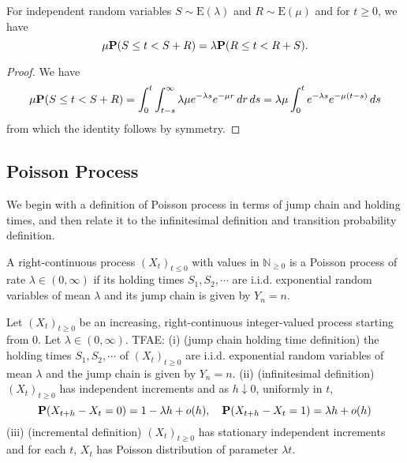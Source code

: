 \begin{theorem}
    For independent random variables \(S \sim \text{E}(\lambda)\) and \(R \sim \text{E}(\mu)\) and for \(t \geq 0\), we have
\[
\mu \mathbf{P}(S \leq t < S + R) = \lambda \mathbf{P}(R \leq t < R + S).
\]
\end{theorem}
\begin{proof}
    We have
    \[
    \mu \mathbf{P}(S \leq t < S + R) = \int_{0}^{t} \int_{t-s}^{\infty} \lambda\mu e^{-\lambda s} e^{-\mu r} \, dr \, ds = \lambda\mu \int_{0}^{t} e^{-\lambda s} e^{-\mu(t-s)} \, ds
    \]
    from which the identity follows by symmetry.
    
\end{proof}
\subsection{Poisson Process}

We begin with a definition of Poisson process in terms of jump chain and holding times, and then relate it to
the infinitesimal definition and transition probability definition.
\begin{definition}
    A right-continuous process $(X_t)_{t\leq 0}$ with values in $\mathbb{N}_{\geq 0}$ is a Poisson process of rate $\lambda\in (0,\infty)$
    if its holding times $S_1,S_2,\cdots$ are i.i.d. exponential random variables of mean $\lambda$ and its jump chain is given by $Y_n=n$.
\end{definition}

\begin{theorem}
    Let $(X_t)_{t\geq 0}$ be an increasing, right-continuous integer-valued process starting from $0$. Let $\lambda\in(0,\infty)$. TFAE:\newline 
    (i) (jump chain holding time definition) the holding times $S_1,S_2,\cdots$ of $(X_t)_{t\geq 0}$ are i.i.d. exponential random variables of mean $\lambda$ 
    and the jump chain is given by $Y_n=n$.\newline 
    (ii) (infinitesimal definition) $(X_t)_{t\geq 0}$ has independent increments and as $h\downarrow 0$, uniformly in $t$,
    \[\mathbf{P}(X_{t+h}-X_t=0)=1-\lambda h+o(h),\quad \mathbf{P}(X_{t+h}-X_t=1)=\lambda h+o(h)\]\newline 
    (iii) (incremental definition) $(X_t)_{t\geq 0}$ has stationary independent increments and for each $t$, $X_t$ has Poisson distribution of parameter $\lambda t$.
\end{theorem}

